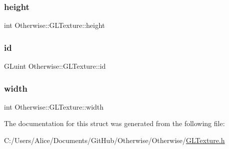 \subsubsection{\texorpdfstring{height}{height}}
{\footnotesize\ttfamily int Otherwise\+::\+G\+L\+Texture\+::height}

\mbox{\label{struct_otherwise_1_1_g_l_texture_ad2a3374e92fc2b9edb60139b2c99e146}} 
\subsubsection{\texorpdfstring{id}{id}}
{\footnotesize\ttfamily G\+Luint Otherwise\+::\+G\+L\+Texture\+::id}

\mbox{\label{struct_otherwise_1_1_g_l_texture_a7a798338d74d76d719f0058f7cb5b460}} 
\subsubsection{\texorpdfstring{width}{width}}
{\footnotesize\ttfamily int Otherwise\+::\+G\+L\+Texture\+::width}



The documentation for this struct was generated from the following file\+:\begin{DoxyCompactItemize}
\item 
C\+:/\+Users/\+Alice/\+Documents/\+Git\+Hub/\+Otherwise/\+Otherwise/\hyperlink{_g_l_texture_8h}{G\+L\+Texture.\+h}\end{DoxyCompactItemize}

